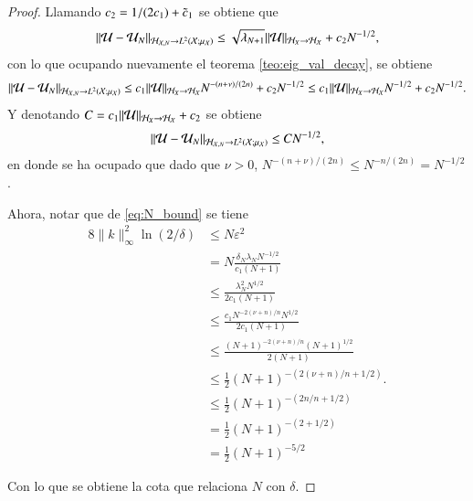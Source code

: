 \begin{proof}
    Llamando $c_2 = 1/(2c_1) + \Tilde{c}_1$ se obtiene que 
    \[
    \|\mathcal{U} - \mathcal{U}_N \|_{\mathcal{H}_{\mathcal{X}, N} \to L^2(\mathcal{X}; \mu_{\mathcal{X}})} \leq \sqrt{\lambda_{N+1}} \|\mathcal{U} \|_{\mathcal{H}_{X} \to \mathcal{H_{\mathcal{X}}}} + c_2 N^{-1/2},
    \]
    con lo que ocupando nuevamente el teorema \ref{teo:eig_val_decay}, se obtiene
    \[
    \|\mathcal{U} - \mathcal{U}_N \|_{\mathcal{H}_{\mathcal{X}, N} \to L^2(\mathcal{X}; \mu_{\mathcal{X}})} \leq c_1 \|\mathcal{U} \|_{\mathcal{H}_{X} \to \mathcal{H_{\mathcal{X}}}} N^{-(n+\nu)/(2n)} + c_2 N^{-1/2} \leq c_1 \|\mathcal{U} \|_{\mathcal{H}_{X} \to \mathcal{H_{\mathcal{X}}}} N^{-1/2} + c_2 N^{-1/2}.
    \]
    Y denotando $C = c_1 \|\mathcal{U} \|_{\mathcal{H}_{X} \to \mathcal{H_{\mathcal{X}}}} + c_2$ se obtiene 
    \[
    \|\mathcal{U} - \mathcal{U}_N \|_{\mathcal{H}_{\mathcal{X}, N} \to L^2(\mathcal{X}; \mu_{\mathcal{X}})} \leq C N^{-1/2},
    \]
    en donde se ha ocupado que dado que $\nu > 0$, $N^{-(n+\nu)/(2n)} \leq N^{-n/(2n)} = N^{-1/2}$.

    Ahora, notar que de \ref{eq:N_bound} se tiene
    \[
    \begin{aligned}
        8\|k\|^2_\infty \ln(2/\delta) & \leq N \varepsilon^2 \\
        & = N \frac{\delta_N \lambda_N N^{-1/2}}{c_1 (N+1)} \\
        & \leq \frac{\lambda_N^2 N^{1/2}}{2c_1 (N+1)} \\
        & \leq \frac{c_1 N^{-2(\nu+n)/n} N^{1/2}}{2c_1 (N+1)} \\
        & \leq \frac{ (N+1)^{-2(\nu+n)/n} (N+1)^{1/2}}{2 (N+1)} \\
        & \leq \frac{1}{2} (N+1)^{-(2(\nu+n)/n + 1/2)}. \\
        & \leq \frac{1}{2} (N+1)^{-(2n/n + 1/2)} \\
        & = \frac{1}{2} (N+1)^{-(2 + 1/2)} \\
        & = \frac{1}{2} (N+1)^{-5/2}
    \end{aligned}
    \]

    Con lo que se obtiene la cota que relaciona $N$ con $\delta$.
\end{proof}



